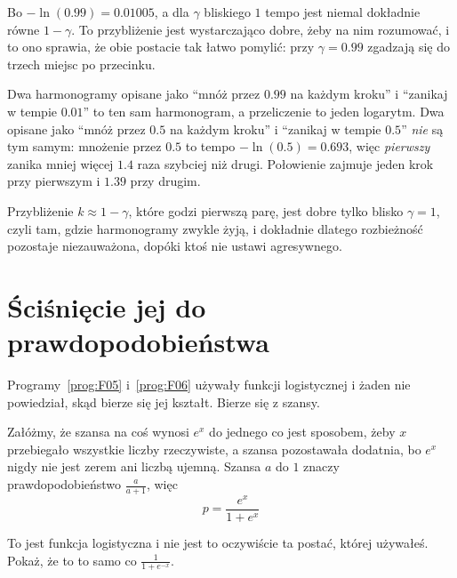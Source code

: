 \begin{fr}
Bo $-\ln(\num{0.99}) = \num{0.01005}$, a dla $\gamma$ bliskiego $1$ tempo jest
niemal dokładnie równe $1 - \gamma$. To przybliżenie jest wystarczająco dobre,
żeby na nim rozumować, i to ono sprawia, że obie postacie tak łatwo pomylić:
przy $\gamma = \num{0.99}$ zgadzają się do trzech miejsc po przecinku.

\begin{aibox}
Dwa harmonogramy opisane jako \enquote{mnóż przez $\num{0.99}$ na każdym
kroku} i \enquote{zanikaj w tempie $\num{0.01}$} to ten sam harmonogram, a
przeliczenie to jeden logarytm. Dwa opisane jako \enquote{mnóż przez
$\num{0.5}$ na każdym kroku} i \enquote{zanikaj w tempie $\num{0.5}$}
\emph{nie} są tym samym: mnożenie przez $\num{0.5}$ to tempo
$-\ln(\num{0.5}) = \num{0.693}$, więc \emph{pierwszy} zanika mniej więcej
$\num{1.4}$ raza szybciej niż drugi. Połowienie zajmuje jeden krok przy
pierwszym i $\num{1.39}$ przy drugim.

Przybliżenie $k \approx 1 - \gamma$, które godzi pierwszą parę, jest dobre
tylko blisko $\gamma = 1$, czyli tam, gdzie harmonogramy zwykle żyją, i
dokładnie dlatego rozbieżność pozostaje niezauważona, dopóki ktoś nie ustawi
agresywnego.
\end{aibox}
\end{fr}

\section{Ściśnięcie jej do prawdopodobieństwa}
\label{sec:F07-logistic}

\begin{fr}
Programy~\ref{prog:F05} i~\ref{prog:F06} używały funkcji logistycznej i żaden
nie powiedział, skąd bierze się jej kształt. Bierze się z szansy.

Załóżmy, że szansa na coś wynosi $e^{x}$ do jednego \dash{} co jest
sposobem, żeby $x$ przebiegało wszystkie liczby rzeczywiste, a szansa
pozostawała dodatnia, bo $e^{x}$ nigdy nie jest zerem ani liczbą ujemną.
Szansa $a$ do $1$ znaczy prawdopodobieństwo $\frac{a}{a+1}$, więc
\[ p = \frac{e^{x}}{1 + e^{x}} \]

To jest funkcja logistyczna i nie jest to oczywiście ta postać, której
używałeś. Pokaż, że to to samo co $\frac{1}{1 + e^{-x}}$.
\nextframe
\end{fr}

